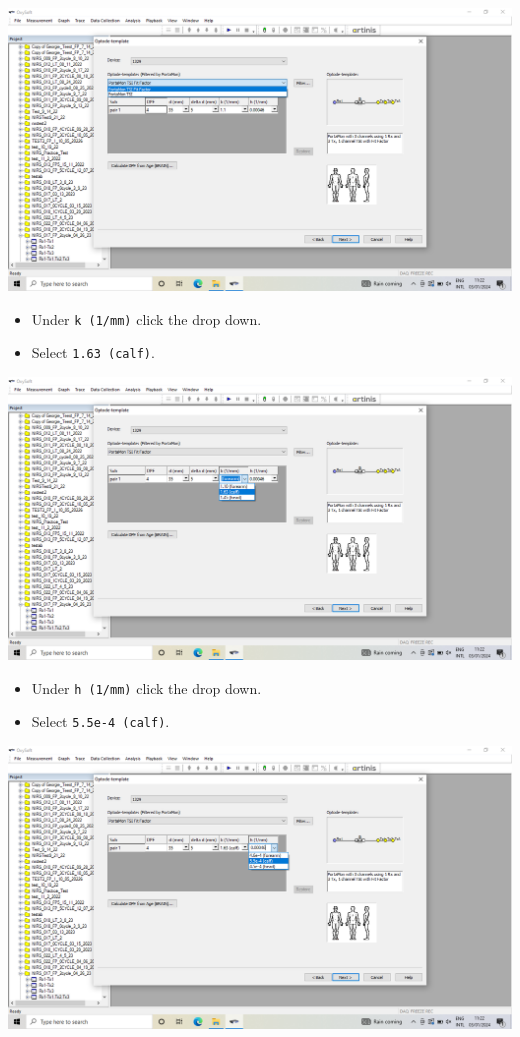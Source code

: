 \documentclass[
]{book}
\providecommand{\tightlist}{%
  \setlength{\itemsep}{0pt}\setlength{\parskip}{0pt}}
\begin{document}
\includegraphics[width=1\linewidth]{images/startnewmeasurement/10_select_tsiff}

\begin{itemize}
\tightlist
\item
  Under \texttt{k\ (1/mm)} click the drop down.
\item
  Select \texttt{1.63\ (calf)}.
\end{itemize}

\includegraphics[width=1\linewidth]{images/startnewmeasurement/11_k_calf}

\begin{itemize}
\tightlist
\item
  Under \texttt{h\ (1/mm)} click the drop down.
\item
  Select \texttt{5.5e-4\ (calf)}.
\end{itemize}

\includegraphics[width=1\linewidth]{images/startnewmeasurement/12_h_calf}
\end{document}
